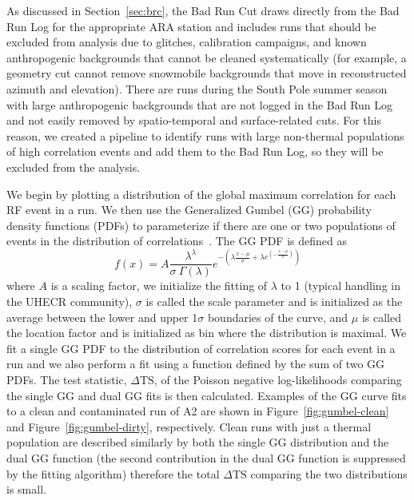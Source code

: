     As discussed in Section~\ref{sec:brc}, the Bad Run Cut draws directly from the Bad Run Log for the appropriate ARA station and includes runs that should be excluded from analysis due to glitches, calibration campaigns, and known anthropogenic backgrounds that cannot be cleaned systematically (for example, a geometry cut cannot remove snowmobile backgrounds that move in reconstructed azimuth and elevation). 
    There are runs during the South Pole summer season with large anthropogenic backgrounds that are not logged in the Bad Run Log and not easily removed by spatio-temporal and surface-related cuts.
    For this reason, we created a pipeline to identify runs with large non-thermal populations of high correlation events and add them to the Bad Run Log, so they will be excluded from the analysis. 

    We begin by plotting a distribution of the global maximum correlation for each RF event in a run.
    We then use the Generalized Gumbel (GG) probability density functions (PDFs) to parameterize if there are one or two populations of events in the distribution of correlations~\citep{gumbel1, gumbel2}.
    The GG PDF is defined as
    \begin{equation}
      f(x) = A \frac{ \lambda^{\lambda} }{ \sigma ~ \Gamma(\lambda) } e^{- ( \lambda \frac{x-\mu}{\sigma} + \lambda e^{({-\frac{x-\mu}{\sigma} })} ) }
      \label{eq:gumbel}
    \end{equation}
    where $A$ is a scaling factor, we initialize the fitting of $\lambda$ to 1 (typical handling in the UHECR community), $\sigma$ is called the scale parameter and is initialized as the average between the lower and upper 1$\sigma$ boundaries of the curve, and $\mu$ is called the location factor and is initialized as bin where the distribution is maximal. 
    We fit a single GG PDF to the distribution of correlation scores for each event in a run and we also perform a fit using a function defined by the sum of two GG PDFs.
    The test statistic,  $\Delta \text{TS}$, of the Poisson negative log-likelihoods comparing the single GG and dual GG fits is then calculated.
    Examples of the GG curve fits to a clean and contaminated run of A2 are shown in Figure~\ref{fig:gumbel-clean} and Figure~\ref{fig:gumbel-dirty}, respectively. 
    Clean runs with just a thermal population are described similarly by both the single GG distribution and the dual GG function (the second contribution in the dual GG function is suppressed by the fitting algorithm) therefore the total $\Delta \text{TS}$ comparing the two distributions is small. 
